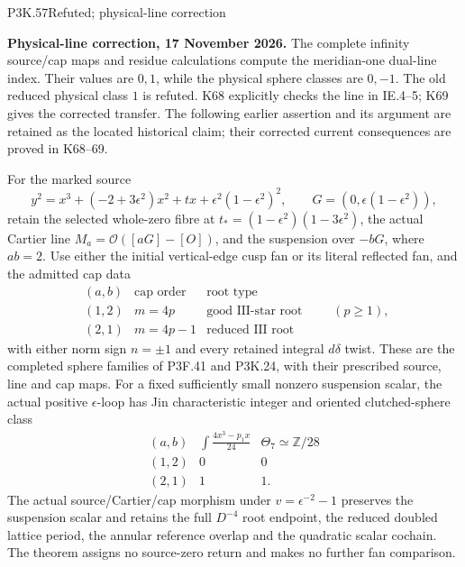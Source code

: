 \begin{statement}{P3K.57}{Refuted; physical-line correction}\par\noindent\textbf{Physical-line correction, 17 November 2026.} The complete infinity source/cap maps and residue calculations compute the meridian-one dual-line index. Their values are \(0,1\), while the physical sphere classes are \(0,-1\). The old reduced physical class \(1\) is refuted. K68 explicitly checks the line in IE.4--5; K69 gives the corrected transfer. The following earlier assertion and its argument are retained as the located historical claim; their corrected current consequences are proved in K68--69.\medskip\par 
For the marked source
\[
 y^2=x^3+(-2+3\epsilon^2)x^2+t x
       +\epsilon^2(1-\epsilon^2)^2,\qquad
 G=(0,\epsilon(1-\epsilon^2)),
\]
retain the selected whole-zero fibre at
\(t_*=(1-\epsilon^2)(1-3\epsilon^2)\), the actual Cartier line
\(M_a=\mathcal O([aG]-[O])\), and the suspension over \(-bG\),
where \(ab=2\). Use either the initial vertical-edge cusp fan or its
literal reflected fan, and the admitted cap data
\[
 \begin{array}{c|c|c}
 (a,b)&\text{cap order}&\text{root type}\\ \hline
 (1,2)&m=4p&\text{good III-star root}\\
 (2,1)&m=4p-1&\text{reduced III root}
 \end{array}\qquad(p\ge1),
\]
with either norm sign \(n=\pm1\) and every retained integral
\(d\delta\) twist. These are the completed sphere families of
P3F.41 and P3K.24, with their prescribed source, line and cap maps.
For a fixed sufficiently small nonzero suspension scalar, the actual
positive \(\epsilon\)-loop has Jin characteristic integer and oriented
clutched-sphere class
\[
 \begin{array}{c|c|c}
 (a,b)&\displaystyle\int\frac{4x^3-p_1x}{24}
       &\Theta_7\simeq\mathbb Z/28\\ \hline
 (1,2)&0&0\\
 (2,1)&1&1.
 \end{array}
\]
The actual source/Cartier/cap morphism under
\(v=\epsilon^{-2}-1\) preserves the suspension scalar and retains
the full \(D^{-4}\) root endpoint, the reduced doubled lattice period,
the annular reference overlap and the quadratic scalar cochain.
The theorem assigns no source-zero return and makes no further fan comparison.
\end{statement}
